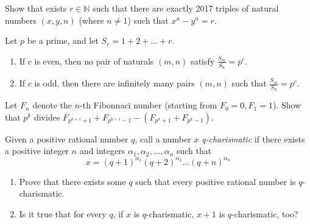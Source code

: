 





 {Show that exists $r\in \mathbb{N}$ such that there are exactly 2017 triples of natural numbers $(x,y,n)$ (where $n\neq 1$) such that $x^n-y^n=r$.}

 {Let $p$ be a prime, and let $S_r=1+2+...+r$.
\begin{enumerate}
    \item If $c$ is even, then no pair of naturals $(m,n)$ satisfy $\frac{S_m}{S_n}=p^c$.
    \item If $c$ is odd, then there are infinitely many pairs $(m,n)$ such that $\frac{S_m}{S_n}=p^c$.
\end{enumerate}}


 {Let $F_n$ denote the $n$-th Fibonnaci number (starting from $F_0=0,F_1=1$). Show that $p^k$ divides $F_{p^{k+1}+1}+F_{p^{k+1}-1}-(F_{p^k+1}+F_{p^k-1})$.}

 {Given a positive rational number $q$, call a number $x$ \textit{q-charismatic} if
there exists a positive integer $n$ and integers $\alpha_1, \alpha_2,...,\alpha_n$ such that
$$x = (q+1)^{\alpha_1}(q+2)^{\alpha_2}...(q+n)^{\alpha_n}$$
\begin{enumerate}
    \item Prove that there exists some $q$ such that every positive rational number is $q$-charismatic.
    \item Is it true that for every $q$, if $x$ is $q$-charismatic, $x + 1$ is $q$-charismatic, too?
\end{enumerate}}

